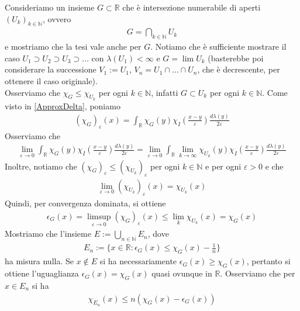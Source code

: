 \documentclass[oneside, 11pt]{amsbook}
\makeatletter
\newcommand{\R}{\mathbb{R}}
\newcommand{\N}{{\mathbb N}}
\newcommand{\0}{{(0)}}
\newcommand{\3}{{(3)}}
\newcommand{\e}{{\varepsilon}}
\theoremstyle{colonplain}
\theoremstyle{colondefinition}
\theoremstyle{colonremark}
\numberwithin{equation}{chapter}
\renewcommand{\proofname}{Dimostrazione}
\renewenvironment{proof}[1][\proofname]{\par
  \pushQED{\qed}%
  \normalfont \topsep6\p@\@plus6\p@\relax
  \trivlist
  \item[\hskip\labelsep\bfseries #1:]\ignorespaces
}{%
  \popQED\endtrivlist\@endpefalse
}
\makeatother
\begin{document}
\begin{proof}
    Consideriamo un insieme $G \subset \R$ che è intersezione numerabile di aperti $(U_k)_{k \in \N}$, ovvero
    \begin{align}
        G = \bigcap_{k \in \N} U_k
    \end{align}
    e mostriamo che la tesi vale anche per $G$. Notiamo che è sufficiente mostrare il caso $U_1 \supset U_2 \supset U_3 \supset \dots$ con $\lambda(U_1) < \infty$ e $G = \lim U_k$ (basterebbe poi considerare la successione $V_1 := U_1$, $V_n = U_1 \cap \dots \cap U_n$, che è decrescente, per ottenere il caso originale). \\
    Osserviamo che $\chi_G \leq \chi_{U_k}$ per ogni $k \in \N$, infatti $G \subset U_k$ per ogni $k \in \N$. Come visto in \eqref{ApproxDelta}, poniamo
    \begin{align}
        (\chi_G)_\e(x) = \int_\R \chi_G(y)\chi_I\left(\frac{x - y}{\e}\right)\frac{d\lambda(y)}{2\e}
    \end{align}
    Osserviamo che
    \begin{align}
        \lim_{\e \rightarrow 0} \int_\R \chi_G(y)\chi_I\left(\frac{x - y}{\e}\right)\frac{d\lambda(y)}{2\e} = \lim_{\e \rightarrow 0} \int_\R \lim_{k \rightarrow \infty}\chi_{U_k}(y)\chi_I\left(\frac{x - y}{\e}\right)\frac{d\lambda(y)}{2\e}
    \end{align}
    Inoltre, notiamo che $(\chi_G)_\e \leq (\chi_{U_k})_\e$ per ogni $k \in \N$ e per ogni $\e > 0$ e che
    \begin{align}
        \lim_{\e \rightarrow 0} (\chi_{U_k})_\e(x) = \chi_{U_k}(x)
    \end{align}
    Quindi, per convergenza dominata, si ottiene
    \begin{align}
        \epsilon_G(x) = \limsup_{\e \rightarrow 0} (\chi_G)_\e(x) \leq \lim_k \chi_{U_k}(x) = \chi_G(x)
    \end{align}
    Mostriamo che l'insieme $E := \bigcup_{n \in \N} E_n$, dove
    \begin{align}
        E_n := \{x \in \R : \epsilon_G(x) \leq \chi_G(x) - \frac{1}{n}\}
    \end{align}
    ha misura nulla. Se $x \not\in E$ si ha necessariamente $\epsilon_G(x) \geq \chi_G(x)$, pertanto si ottiene l'uguaglianza $\epsilon_G(x) = \chi_G(x)$ quasi ovunque in $\R$. Osserviamo che per $x \in E_n$ si ha
    \begin{align}
        \chi_{E_n}(x) \leq n(\chi_G(x) - \epsilon_G(x))
    \end{align}

\end{proof}
\end{document}
